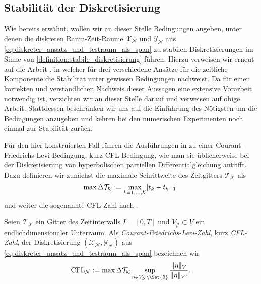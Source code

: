 \documentclass[../main.tex]{subfiles}
\begin{document}
\subsection*{Stabilität der Diskretisierung} %

Wie bereits erwähnt, wollen wir an dieser Stelle Bedingungen angeben, unter denen die diskreten Raum-Zeit-Räume $\mathcal X_{\mathcal N}$ und $\mathcal Y_{\mathcal N}$ aus \cref{eq:diskreter_ansatz_und_testraum_als_span} zu stabilen Diskretisierungen im Sinne von \cref{definition:stabile_diskretisierung} führen.
Hierzu verweisen wir erneut auf die Arbeit \cite[Section 5.2]{Andreev:2012ep}, in welcher \citeauthor{Andreev:2012ep} für drei verschiedene Ansätze für die zeitliche Komponente die Stabilität unter gewissen Bedingungen nachweist.
Da für einen korrekten und verständlichen Nachweis dieser Aussagen eine extensive Vorarbeit notwendig ist, verzichten wir an dieser Stelle darauf und verweisen auf obige Arbeit.
Stattdessen beschränken wir uns auf die Einführung des Nötigsten um die Bedingungen anzugeben und kehren bei den numerischen Experimenten noch einmal zur Stabilität zurück.

Für den hier konstruierten Fall führen die Ausführungen in \cite{Andreev:2012ep} zu einer Courant-Friedrichs-Levi-Bedingung, kurz CFL-Bedingung, wie man sie üblicherweise bei der Diskretisierung von hyperbolischen partiellen Differentialgleichung antrifft.
Dazu definieren wir zunächst die maximale Schrittweite des Zeitgitters $\mathcal T_{\mathcal K}$ als
\begin{equation}
    \label{eq:maximale_zeitschrittweite}
    \max \Delta \mathcal T_{\mathcal K} := \max_{k = 1, \dots, \mathcal K} \lvert t_{k} - t_{k - 1}\rvert
\end{equation}
und weiter die sogenannte CFL-Zahl nach \cite[62]{Andreev:2012ep}.

\begin{Definition}
    Seien $\mathcal T_{\mathcal K}$ ein Gitter des Zeitintervalls $I = [0, T]$ und $V_{\mathcal J} \subset V$ ein endlichdimensionaler Unterraum.
    Als \emph{Courant-Friedrichs-Levi-Zahl}, kurz \emph{CFL-Zahl}, der Diskretisierung $(\mathcal X_{\mathcal N}, \mathcal Y_{\mathcal N})$ aus \cref{eq:diskreter_ansatz_und_testraum_als_span} bezeichnen wir
    \begin{equation}
        \label{eq:cfl_zahl}
        \mathrm{CFL}_{\mathcal N} := \max \Delta \mathcal T_{\mathcal K} \sup_{\eta \in V_{\mathcal J} \setminus \Set{0} } \frac{\norm{\eta}_{V}}{\norm{\eta}_{V'}}.
    \end{equation}
\end{Definition}
\end{document}
